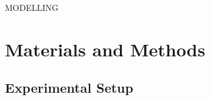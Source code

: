 \documentclass[handout]{beamer}
\begin{document}
\begin{frame}{MODELLING}
\begin{minipage}[c]{1\linewidth}
\begin{minipage}[c]{0.6\linewidth}
\end{minipage}
\begin{minipage}[c]{0.36\linewidth}
\end{minipage}
\end{minipage}

\end{frame}

\section{Materials and Methods}
\subsection{Experimental Setup}
\end{document}
